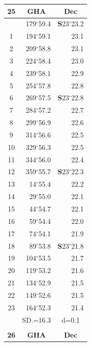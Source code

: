 \documentclass[10pt, a4paper]{report}
\begin{document}
\begin{scriptsize}
\begin{tabular*}{0.2\textwidth}[t]{@{\extracolsep{\fill}}|c|rr|}
\hline
\multicolumn{1}{|c|}{\rule{0pt}{2.6ex}\textbf{25}} & \multicolumn{1}{c}{\textbf{GHA}} & \multicolumn{1}{c|}{\textbf{Dec}}\\
\hline\rule{0pt}{2.6ex}\noindent
0 & 179$^\circ$59.4 & \textbf{S}23$^\circ$23.2\\
1 & 194$^\circ$59.1 & 23.1\\
2 & 209$^\circ$58.8 & 23.1\\
3 & 224$^\circ$58.4 & \raisebox{0.24ex}{\boldmath$\cdot$~\boldmath$\cdot$~~}23.0\\
4 & 239$^\circ$58.1 & 22.9\\
5 & 254$^\circ$57.8 & 22.8\\[2Pt]
6 & 269$^\circ$57.5 & \textbf{S}23$^\circ$22.8\\
7 & 284$^\circ$57.2 & 22.7\\
8 & 299$^\circ$56.9 & 22.6\\
9 & 314$^\circ$56.6 & \raisebox{0.24ex}{\boldmath$\cdot$~\boldmath$\cdot$~~}22.5\\
10 & 329$^\circ$56.3 & 22.5\\
11 & 344$^\circ$56.0 & 22.4\\[2Pt]
12 & 359$^\circ$55.7 & \textbf{S}23$^\circ$22.3\\
13 & 14$^\circ$55.4 & 22.2\\
14 & 29$^\circ$55.0 & 22.1\\
15 & 44$^\circ$54.7 & \raisebox{0.24ex}{\boldmath$\cdot$~\boldmath$\cdot$~~}22.1\\
16 & 59$^\circ$54.4 & 22.0\\
17 & 74$^\circ$54.1 & 21.9\\[2Pt]
18 & 89$^\circ$53.8 & \textbf{S}23$^\circ$21.8\\
19 & 104$^\circ$53.5 & 21.7\\
20 & 119$^\circ$53.2 & 21.6\\
21 & 134$^\circ$52.9 & \raisebox{0.24ex}{\boldmath$\cdot$~\boldmath$\cdot$~~}21.5\\
22 & 149$^\circ$52.6 & 21.5\\
23 & 164$^\circ$52.3 & 21.4\\
\hline
\rule{0pt}{2.4ex} & \multicolumn{1}{c}{SD.=16.3} & \multicolumn{1}{c|}{d=0.1}\\
\hline
\multicolumn{1}{c}{}\\[-0.5ex]\hline
\multicolumn{1}{|c|}{\rule{0pt}{2.6ex}\textbf{26}} & \multicolumn{1}{c}{\textbf{GHA}} & \multicolumn{1}{c|}{\textbf{Dec}}\\

\end{tabular*}
\end{scriptsize}
\end{document}
